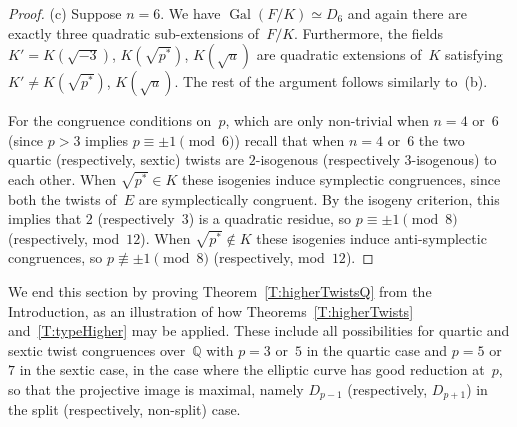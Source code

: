 \documentclass[12pt, reqno]{amsart}
\newcommand{\Q}{\mathbb{Q}}
\DeclareMathOperator{\Gal}{Gal}
\numberwithin{equation}{section}
\theoremstyle{definition}
\theoremstyle{remark}
\begin{document}
\begin{proof}
(c) Suppose $n=6$. We have $\Gal(F/K) \simeq D_6$ and again there are exactly three quadratic sub-extensions of~$F/K$.
Furthermore, the fields 
$K'=K(\sqrt{-3})$, $K(\sqrt{p^*})$, $K(\sqrt{u})$ 
are quadratic extensions of~$K$ satisfying
$K' \neq K(\sqrt{p^*})$, $K(\sqrt{u})$. 
The rest of the argument follows similarly to~(b).

For the congruence conditions on~$p$, which are only non-trivial when
$n=4$ or~$6$ (since $p>3$ implies $p\equiv\pm1\pmod6$) recall that
when $n=4$ or~$6$ the two quartic (respectively, sextic) twists are
$2$-isogenous (respectively $3$-isogenous) to each other.  When
$\sqrt{p^*}\in K$ these isogenies induce symplectic congruences, since
both the twists of~$E$ are symplectically congruent.  By the isogeny
criterion, this implies that $2$ (respectively~$3$) is a quadratic
residue, so $p\equiv\pm1\pmod{8}$ (respectively, mod~$12$).  When
$\sqrt{p^*}\notin K$ these isogenies induce anti-symplectic
congruences, so $p\not\equiv\pm1\pmod{8}$ (respectively, mod~$12$).
\end{proof}

We end this section by proving Theorem~\ref{T:higherTwistsQ} from the
Introduction, as an illustration of how Theorems~\ref{T:higherTwists}
and~\ref{T:typeHigher} may be applied.  These include all
possibilities for quartic and sextic twist congruences over~$\Q$ with
$p=3$ or~$5$ in the quartic case and $p=5$ or~$7$ in the sextic case,
in the case where the elliptic curve has good reduction at~$p$, so
that the projective image is maximal, namely $D_{p-1}$ (respectively,
$D_{p+1}$) in the split (respectively, non-split) case.
\end{document}
